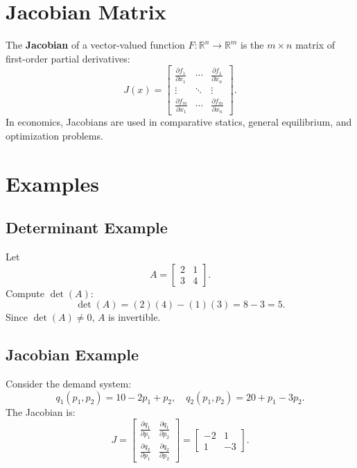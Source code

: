 \documentclass[11pt]{article}
\newcommand{\R}{\mathbb{R}}
\begin{document}
\section{Jacobian Matrix}
The \textbf{Jacobian} of a vector-valued function $F:\R^n \to \R^m$ is the $m \times n$ matrix of first-order partial derivatives:
\[
J(x) = 
\begin{bmatrix}
\frac{\partial f_1}{\partial x_1} & \cdots & \frac{\partial f_1}{\partial x_n} \\
\vdots & \ddots & \vdots \\
\frac{\partial f_m}{\partial x_1} & \cdots & \frac{\partial f_m}{\partial x_n}
\end{bmatrix}.
\]
In economics, Jacobians are used in comparative statics, general equilibrium, and optimization problems.




\section*{Examples}

\subsection{Determinant Example}
Let 
\[
A = \begin{bmatrix} 2 & 1 \\ 3 & 4 \end{bmatrix}.
\]
Compute $\det(A)$:
\[
\det(A) = (2)(4) - (1)(3) = 8 - 3 = 5.
\]
Since $\det(A) \neq 0$, $A$ is invertible.



\subsection{Jacobian Example}
Consider the demand system:
\[
q_1(p_1, p_2) = 10 - 2p_1 + p_2, 
\quad q_2(p_1, p_2) = 20 + p_1 - 3p_2.
\]
The Jacobian is:
\[
J = 
\begin{bmatrix}
\frac{\partial q_1}{\partial p_1} & \frac{\partial q_1}{\partial p_2} \\
\frac{\partial q_2}{\partial p_1} & \frac{\partial q_2}{\partial p_2}
\end{bmatrix}
=
\begin{bmatrix}
-2 & 1 \\
1 & -3
\end{bmatrix}.
\]
\end{document}
